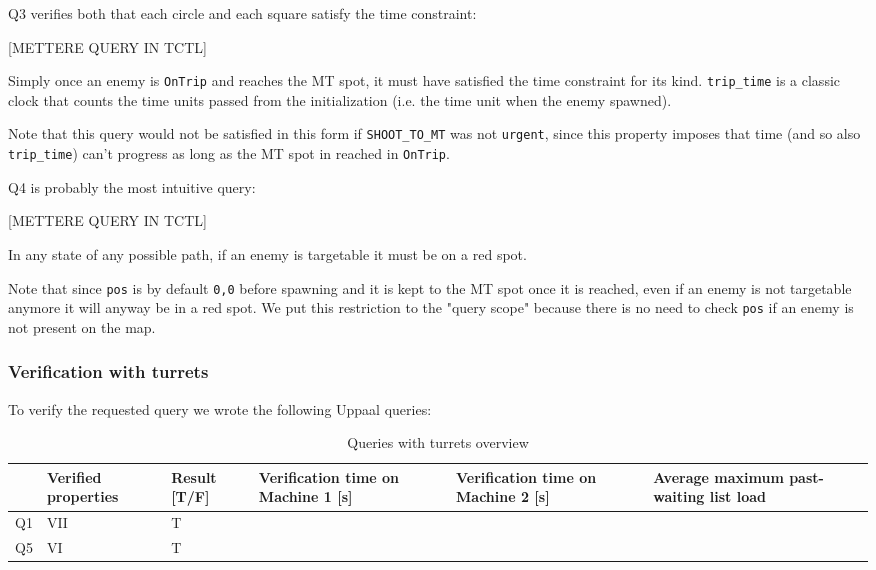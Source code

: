 \documentclass[
10pt, %
a4paper, %
oneside, %
headinclude,footinclude, %
BCOR5mm, %
]{scrartcl}
\begin{document}
				Q3 verifies both that each circle and each square satisfy the time constraint:
				\begin{center}
					[METTERE QUERY IN TCTL]
				\end{center}
				Simply once an enemy is \texttt{OnTrip} and reaches the MT spot, it must have satisfied the time constraint for its kind. \texttt{trip\_time} is a classic clock that counts the time units passed from the initialization (i.e. the time unit when the enemy spawned).
				
				Note that this query would not be satisfied in this form if \texttt{SHOOT\_TO\_MT} was not \texttt{urgent}, since this property imposes that time (and so also \texttt{trip\_time}) can't progress as long as the MT spot in reached in \texttt{OnTrip}.
				
				Q4 is probably the most intuitive query:
				\begin{center}
					[METTERE QUERY IN TCTL]
				\end{center}
				In any state of any possible path, if an enemy is targetable it must be on a red spot.
				
				Note that since \texttt{pos} is by default \texttt{{0,0}} before spawning and it is kept to the MT spot once it is reached, even if an enemy is not targetable anymore it will anyway be in a red spot. We put this restriction to the "query scope" because there is no need to check \texttt{pos} if an enemy is not present on the map. 
			\subsubsection{Verification with turrets}
				To verify the requested query we wrote the following Uppaal queries:
				\begin{table}[h!]
					\centering
					\begin{tabularx}{\textwidth}{||c|>{\raggedright\arraybackslash}X|>{\raggedright\arraybackslash}X|>{\raggedright\arraybackslash}X|>{\raggedright\arraybackslash}X|>{\raggedright\arraybackslash}X||}
						\hline
						& Verified properties & Result [T/F] & Verification time on Machine 1 [s] & Verification time on Machine 2 [s] & Average maximum past-waiting list load \\
						\hline
						Q1 & VII & T & & & \\ \hline
						Q5 & VI & T & & &  \\
						\hline
					\end{tabularx}
					\caption{Queries with turrets overview}
				\end{table}
				
\end{document}
